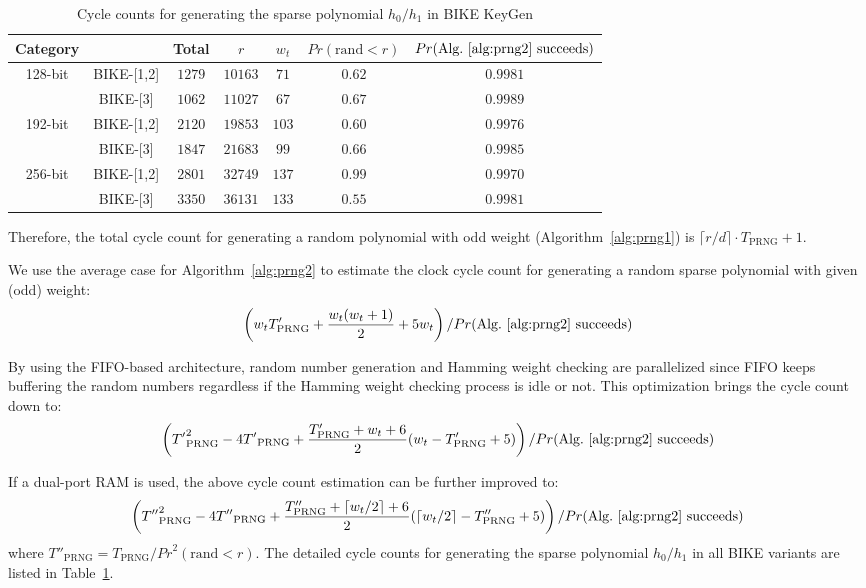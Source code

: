 \documentclass[runningheads]{llncs}
\begin{document}
\begin{table}[!tb]\centering
\caption{Cycle counts for generating the sparse polynomial $h_0/h_1$ in BIKE KeyGen}\label{table:spare_ploy_gen}
\begin{tabular}{cc|ccccc}
  \hline
 \textbf{Category}        &             & Total & $r$  & $w_t$  & $Pr(\text{rand} < r)$& $Pr(\text{Alg.~\ref{alg:prng2} succeeds})$\\\hline
\multirow{ 2}{*}{128-bit} &  BIKE-[1,2] & $1279$ & $10163$  & $71$  & $0.62$ & $0.9981$\\
                          &  BIKE-[3] & $1062$ & $11027$  & $67$  & $0.67$& $0.9989$\\
  \hline
\multirow{ 2}{*}{192-bit} &  BIKE-[1,2] & $2120$ & $19853$  & $103$  &$0.60$& $0.9976$\\
                          &  BIKE-[3] & $1847$ & $21683$  & $99$  &$0.66$& $0.9985$\\
  \hline
\multirow{ 2}{*}{256-bit} &  BIKE-[1,2] & $2801$ & $32749$  & $137$  &$0.99$& $0.9970$\\
                          &  BIKE-[3] & $3350$ & $36131$  & $133$  &$0.55$& $0.9981$\\
  \hline
\end{tabular}
\vspace{-4mm}
\end{table}

Therefore, the total cycle count for generating a random polynomial with odd weight (Algorithm~\ref{alg:prng1}) is
$\lceil r/d\rceil\cdot T_{\text{PRNG}} + 1$.


We use the average case for Algorithm~\ref{alg:prng2} to estimate the clock cycle count for generating a random sparse polynomial with given (odd) weight:
\[
   \left(w_tT'_{\text{PRNG}} + \frac{w_t(w_t+1)}{2} + 5w_t\right)/Pr(\text{Alg.~\ref{alg:prng2} succeeds})
\]

By using the FIFO-based architecture, random number generation and
Hamming weight checking are parallelized since FIFO keeps buffering
the random numbers regardless if the Hamming weight checking
process is idle or not. This optimization brings the cycle count down to:
\[
    \left({T'}_{\text{PRNG}}^2 - 4{T'}_{\text{PRNG}} + \frac{T'_{\text{PRNG}}+w_t+6}{2}(w_t-T'_{\text{PRNG}}+5)\right)/Pr(\text{Alg.~\ref{alg:prng2} succeeds})
\]

If a dual-port RAM is used, the above cycle count estimation can be further improved to:
\[
    \left({T''}_{\text{PRNG}}^2 - 4{T''}_{\text{PRNG}} + \frac{T''_{\text{PRNG}}+\lceil w_t/2\rceil+6}{2}(\lceil w_t/2\rceil-T''_{\text{PRNG}}+5)\right)/Pr(\text{Alg.~\ref{alg:prng2} succeeds})
\]
where ${T''}_{\text{PRNG}}=T_{\text{PRNG}}/{Pr}^2(\text{rand} < r)$. The detailed cycle counts for generating the sparse polynomial $h_0/h_1$ in all BIKE variants are listed in Table~\ref{table:spare_ploy_gen}.
\end{document}
